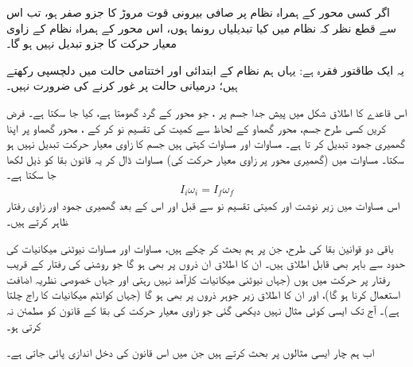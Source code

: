 اگر کسی محور  کے ہمراہ  نظام پر صافی بیرونی قوت مروڑ کا جزو صفر ہو،  تب اس سے قطع نظر کہ نظام میں کیا تبدیلیاں رونما ہوں، اس محور  کے ہمراہ نظام کے زاوی معیار حرکت  کا جزو  تبدیل نہیں ہو گا۔

یہ ایک طاقتور  فقرہ ہے: یہاں ہم نظام کے ابتدائی اور اختتامی حالت میں دلچسپی رکھتے ہیں؛  درمیانی  حالت  پر غور کرنے کی ضرورت نہیں۔

اس   قاعدے کا اطلاق شکل  میں پیش  جدا جسم پر  ، جو  محور  کے گرد گھومتا ہے،  کیا جا سکتا ہے۔ فرض کریں کسی طرح  جسم، محور گھماو کے لحاظ سے  کمیت کی تقسیم نو کر کے ، محور گھماو پر اپنا گھمیری جمود تبدیل کر تا ہے۔ مساوات  اور مساوات  کہتی ہیں جسم کا  زاوی معیار حرکت تبدیل نہیں ہو سکتا۔ مساوات  میں (گھمیری محور پر زاوی معیار حرکت کی) مساوات     ڈال کر   یہ  قانون بقا کو ذیل لکھا جا سکتا ہے۔
\begin{align}\label{مساوات_لڑھکاو_اول_آخر}
I_i\omega_i=I_f\omega_f
\end{align}
اس مساوات میں زیر نوشت  اور  کمیتی تقسیم نو سے قبل اور اس کے بعد گھمیری جمود اور زاوی رفتار  ظاہر کرتے ہیں۔

باقی دو قوانین بقا کی طرح، جن پر ہم بحث کر چکے ہیں،  مساوات  اور مساوات  نیوٹنی  میکانیات  کی حدود سے باہر بھی قابل اطلاق ہیں۔ ان کا اطلاق ان ذروں پر بھی ہو گا جو روشنی کی رفتار کے قریب رفتار پر حرکت میں ہوں (جہاں نیوٹنی میکانیات کارآمد نہیں رہتی اور جہاں   خصوصی نظریہ  اضافت استعمال کرنا  ہو گا)، اور ان کا اطلاق  زیر جوہر ذروں پر بھی ہو گا (جہاں کوانٹم میکانیات کا راج چلتا ہے)۔ آج تک ایسی کوئی مثال نہیں دیکھی گئی جو زاوی معیار حرکت کی بقا  کے قانون کو مطمئن نہ کرتی ہو۔

اب ہم چار ایسی مثالوں  پر بحث کرتے ہیں جن میں  اس  قانون  کی  دخل اندازی  پائی جاتی ہے۔

